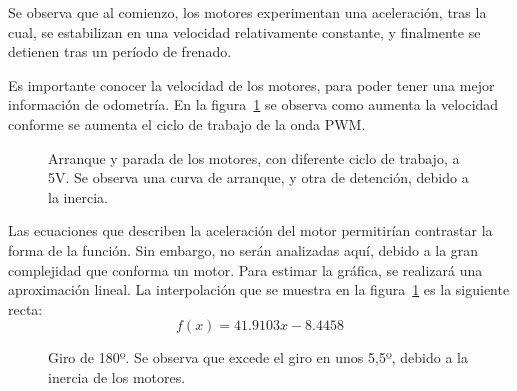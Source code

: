 \documentclass[10pt,a4paper,hidelinks,twocolumn,nobalancelastpage]{article}
\begin{document}
Se observa que al comienzo, los motores experimentan una aceleración, tras la 
cual, se estabilizan en una velocidad relativamente constante, y finalmente se 
detienen tras un período de frenado.

Es importante conocer la velocidad de los motores, para poder tener una mejor 
información de odometría. En la figura~\ref{fig:velocidad-pwm} se observa como 
aumenta la velocidad conforme se aumenta el ciclo de trabajo de la onda PWM.

\begin{figure}[h]
\centering
{}
\caption{Arranque y parada de los motores, con diferente ciclo de trabajo, a 5V.  
Se observa una curva de arranque, y otra de detención, debido a la inercia.
\label{fig:velocidad-pwm}}
	\end{figure}

Las ecuaciones que describen la aceleración del motor permitirían contrastar la 
forma de la función. Sin embargo, no serán analizadas aquí, debido a la gran 
complejidad que conforma un motor. Para estimar la gráfica, se realizará una 
aproximación lineal. La interpolación que se muestra en la 
figura~\ref{fig:velocidad-pwm} es la siguiente recta:
$$ f(x)=41.9103x - 8.4458$$




\begin{figure}[h]
\centering
{}
\caption{Giro de 180º. Se observa que excede el giro en unos 5,5º, debido a la 
inercia de los motores.\label{fig:giro-180}}
\end{figure}
\end{document}
